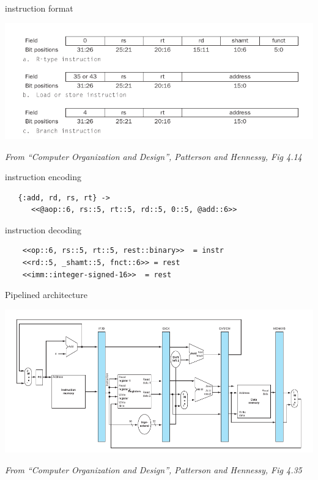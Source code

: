 \begin{frame}{instruction format}

\includegraphics[scale=0.6]{rtype.png}  

\vspace{20pt}
{\em From ``Computer Organization and Design'', Patterson and Hennessy, Fig 4.14}
\end{frame}

\begin{frame}[fragile]{instruction encoding}

 \begin{verbatim}
   {:add, rd, rs, rt} -> 
      <<@aop::6, rs::5, rt::5, rd::5, 0::5, @add::6>>
 \end{verbatim}

\end{frame}

\begin{frame}[fragile]{instruction decoding}

 \begin{lstlisting}
	<<op::6, rs::5, rt::5, rest::binary>>  = instr
	<<rd::5, _shamt::5, fnct::6>> = rest
	<<imm::integer-signed-16>>  = rest
  \end{lstlisting}
\end{frame}

\begin{frame}{Pipelined architecture}
 
\includegraphics[scale=0.5]{pipeline.png}  

\vspace{20pt}
{\em From ``Computer Organization and Design'', Patterson and Hennessy, Fig 4.35}
\end{frame}






